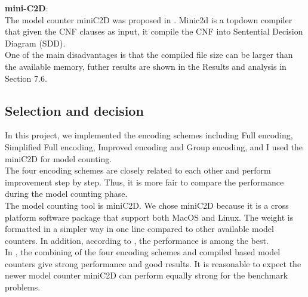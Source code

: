     \noindent \textbf{mini-C2D}:\\
    \noindent The model counter mini\-C2D was proposed in \cite{minic2d}. Minic2d is a top\-down compiler that given the CNF clauses as input, it compile the CNF into Sentential Decision Diagram (SDD).\\
    
   \noindent One of the main disadvantages is that the compiled file size can be larger than the available memory, futher results are shown in the Results and analysis in Section 7.6.
    
    \subsection{Selection and decision}
    In this project, we implemented the encoding schemes including Full encoding, Simplified Full encoding, Improved encoding and Group encoding, and I used the miniC2D for model counting. \\
    
    \noindent The four encoding schemes are closely related to each other and perform improvement step by step. Thus, it is more fair to compare the performance during the model counting phase.\\
    
    \noindent The model counting tool is miniC2D. We chose miniC2D because it is a cross platform software package that support both MacOS and Linux. The weight is formatted in a simpler way in one line compared to other available model counters. In addition, according to \cite{minic2d}, the performance is among the best.\\
    
    \noindent In \cite{2008-literature-review}, the combining of the four encoding schemes and compiled based model counters give strong performance and good results. It is reasonable to expect the newer model counter miniC2D can perform equally strong for the benchmark problems.
    
